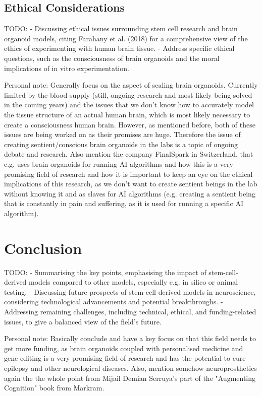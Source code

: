 \documentclass[10pt]{article}
\begin{document}
\begin{sloppypar}
  \subsection{Ethical Considerations}
  \label{sec:ethical-considerations}

  TODO:
  - Discussing ethical issues surrounding stem cell research and brain organoid models, citing Farahany et al. (2018) for a comprehensive view of the ethics of experimenting with human brain tissue.
  - Address specific ethical questions, such as the consciousness of brain organoids and the moral implications of in vitro experimentation.

  Personal note: Generally focus on the aspect of scaling brain organoids. Currently limited by the blood supply (still, ongoing research and most likely being solved in the coming years) and the issues that we don't know how to accurately model the tissue structure of an actual human brain, which is most likely necessary to create a consciousness human brain. However, as mentioned before, both of these issues are being worked on as their promises are huge. Therefore the issue of creating sentient/conscious brain organoids in the labs is a topic of ongoing debate and research. Also mention the company FinalSpark in Switzerland, that e.g. uses brain organoids for running AI algorithms and how this is a very promising field of research and how it is important to keep an eye on the ethical implications of this research, as we don't want to create sentient beings in the lab without knowing it and as slaves for AI algorithms (e.g. creating a sentient being that is constantly in pain and suffering, as it is used for running a specific AI algorithm).

  \section{Conclusion}
  \label{sec:conclusion}

  TODO:
  - Summarising the key points, emphasising the impact of stem-cell-derived models compared to other models, especially e.g. in silico or animal testing.
  - Discussing future prospects of stem-cell-derived models in neuroscience, considering technological advancements and potential breakthroughs.
  - Addressing remaining challenges, including technical, ethical, and funding-related issues, to give a balanced view of the field's future.

  Personal note: Basically conclude and have a key focus on that this field needs to get more funding, as brain organoids coupled with personalised medicine and gene-editing is a very promising field of research and has the potential to cure epilepsy and other neurological diseases. Also, mention somehow neuroprosthetics again the the whole point from Mijail Demian Serruya's part of the "Augmenting Cognition" book from Markram.


  \pagebreak
  
  

\end{sloppypar}
\end{document}
